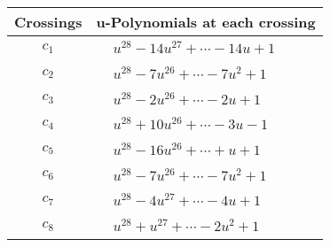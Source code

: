 \documentclass[1p]{elsarticle_modified}
\theoremstyle{definition}
\begin{document}
\begin{tabular}{m{50pt}|m{274pt}}
Crossings & \hspace{64pt}u-Polynomials at each crossing \\
\hline $$\begin{aligned}c_{1}\end{aligned}$$&$\begin{aligned}
&u^{28}-14 u^{27}+\cdots-14 u+1
\end{aligned}$\\
\hline $$\begin{aligned}c_{2}\end{aligned}$$&$\begin{aligned}
&u^{28}-7 u^{26}+\cdots-7 u^2+1
\end{aligned}$\\
\hline $$\begin{aligned}c_{3}\end{aligned}$$&$\begin{aligned}
&u^{28}-2 u^{26}+\cdots-2 u+1
\end{aligned}$\\
\hline $$\begin{aligned}c_{4}\end{aligned}$$&$\begin{aligned}
&u^{28}+10 u^{26}+\cdots-3 u-1
\end{aligned}$\\
\hline $$\begin{aligned}c_{5}\end{aligned}$$&$\begin{aligned}
&u^{28}-16 u^{26}+\cdots+u+1
\end{aligned}$\\
\hline $$\begin{aligned}c_{6}\end{aligned}$$&$\begin{aligned}
&u^{28}-7 u^{26}+\cdots-7 u^2+1
\end{aligned}$\\
\hline $$\begin{aligned}c_{7}\end{aligned}$$&$\begin{aligned}
&u^{28}-4 u^{27}+\cdots-4 u+1
\end{aligned}$\\
\hline $$\begin{aligned}c_{8}\end{aligned}$$&$\begin{aligned}
&u^{28}+u^{27}+\cdots-2 u^2+1
\end{aligned}$\\

\end{tabular}
\end{document}
